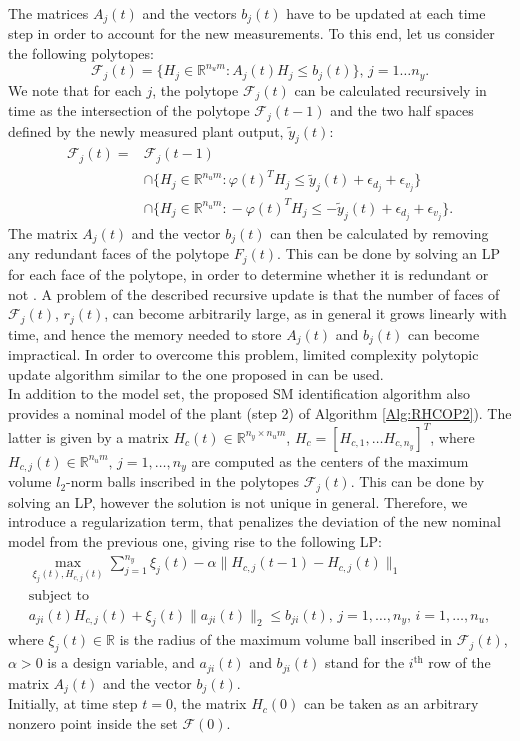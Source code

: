 \documentclass[10 pt, letterpaper]{article}
\newcommand{\beq}{\begin{equation}}
\newcommand{\eeq}{\end{equation}}
\newcommand{\ba}{\begin{array}}
\newcommand{\ea}{\end{array}}
\newcommand{\bR}{{\mathbb R}}
\begin{document}
The matrices $A_j(t)$ and the vectors $b_j(t)$ have to be updated at each time step in order to account for the new measurements. To this end, let us consider the following polytopes:
\beq\label{Eq:definition_of_polytope}
\mathcal{F}_j(t)=\{H_j\in \bR^{n_um}: A_j(t)H_j\leq b_j(t)\},\, j=1\hdots n_y.
\eeq
We note that for each $j$, the polytope $\mathcal{F}_{j}(t)$ can be calculated recursively in time as the intersection of the polytope $\mathcal{F}_{j}(t-1)$ and the two half spaces defined by the newly measured plant output, $\tilde{y}_j(t)$:
\beq\label{Eq:Normal_update}
\begin{aligned}
\mathcal{F}_{j}(t)=
&\mathcal{F}_{j}(t-1) \\
&\cap  \{H_{j}\!\!\in\!\bR^{n_um}\!:\!\varphi(t)^TH_{j}\leq \tilde{y}_j(t)\!+\!\epsilon_{d_j}\!+\!\epsilon_{v_j}\}\\
&\cap  \{H_{j}\!\!\in\!\bR^{n_um}\!:\! -\varphi(t)^TH_{j}\leq -\tilde{y}_j(t)\!+\!\epsilon_{d_j}\!+\!\epsilon_{v_j}\}.
\end{aligned}
\eeq
The matrix $A_j(t)$ and the vector $b_j(t)$ can then be calculated by removing any redundant faces of the polytope $F_j(t)$. This can be done by solving an LP for each face of the polytope, in order to determine whether it is redundant or not \cite{Polytopi1}. A problem of the described recursive update is that the number of faces of $\mathcal{F}_{j}(t)$, $r_j(t)$, can become arbitrarily large,  as in general it grows linearly with time, and hence the memory needed to store $A_j(t)$ and $b_j(t)$ can become impractical. In order to overcome this problem, limited complexity polytopic update algorithm similar to the one proposed in \cite{limited_poly_update} can be used.\\
In addition to the model set, the proposed SM identification algorithm also provides a nominal model of the plant (step 2) of Algorithm \ref{Alg:RHCOP2}). The latter is given by a matrix $H_{c}(t)\in \bR^{n_y\times n_um}$, $H_c=[H_{c,1},\hdots H_{c,n_y}]^T$, where $H_{c,j}(t)\in \bR^{n_um},\, j=1,\hdots, n_y$ are computed as the centers of the maximum volume $l_2$-norm balls inscribed in the polytopes $\mathcal{F}_{j}(t)$. This can be done by solving an LP, however the solution is not unique in general. Therefore, we introduce a regularization term, that penalizes the deviation of the new nominal model from the previous one, giving rise to the following LP:
\beq\label{Eq:central_estimate}
\ba{c}
\max \limits_{\xi_j(t),H_{c,j}(t)} \sum \limits_{j=1}^{n_y}\xi_j(t)-\alpha\|H_{c,j}(t-1)-H_{c,j}(t)\|_1\\
\text{subject to}\\
a_{ji}(t)H_{c,j}(t)\!+\!\xi_j(t)\|a_{ji}(t)\|_2\!\leq\! b_{ji}(t), \, j=1,\hdots, n_y,\, i=1,\hdots, n_u,
\ea
\eeq
 where $\xi_j(t) \in \bR$ is the radius of the maximum volume ball inscribed in $\mathcal{F}_{j}(t)$, $\alpha>0$ is a design variable, and $a_{ji}(t)$ and $b_{ji}(t)$ stand for the $i^{\text{th}}$ row of the matrix $A_j(t)$ and the vector $b_j(t)$.\\
Initially, at time step $t=0$, the matrix $H_{c}(0)$ can be taken as an arbitrary nonzero point inside the set $\mathcal{F}(0)$.
\end{document}
